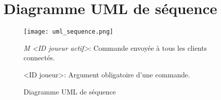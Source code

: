 \section{Diagramme UML de séquence}

\begin{figure}[H]
    \begin{center}
        \texttt{[image: uml\_sequence.png]}
    \end{center}

    \tiny
    \textit{M <ID joueur actif>}: Commande envoyée à tous les clients connectés.

    <ID joueur>: Argument obligatoire d'une commande.
    \caption{Diagramme UML de séquence}
    \label{fig:uml_sequence}
\end{figure}
